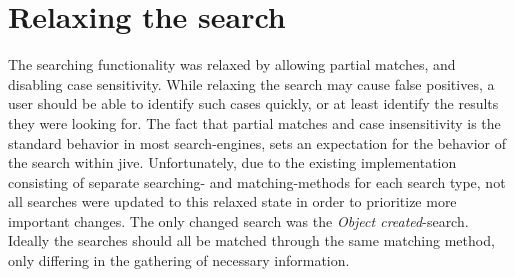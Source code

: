 \section{Relaxing the search}\label{implSearch}
The searching functionality was relaxed by allowing partial matches, and disabling case sensitivity.
While relaxing the search may cause false positives, a user should be able to identify such cases quickly, or at least identify the results they were looking for.
The fact that partial matches and case insensitivity is the standard behavior in most search-engines, sets an expectation for the behavior of the search within \gls{jive}.
Unfortunately, due to the existing implementation consisting of separate searching- and matching-methods for each search type, not all searches were updated to this relaxed state in order to prioritize more important changes.
The only changed search was the \emph{Object created}-search.
Ideally the searches should all be matched through the same matching method, only differing in the gathering of necessary information.

